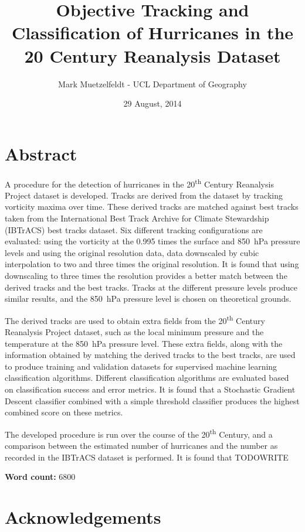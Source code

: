 \documentclass[pdftex,12pt,a4paper]{report}
\title{Objective Tracking and Classification of Hurricanes in the 20\ts{th} Century Reanalysis Dataset}
\author{Mark Muetzelfeldt - UCL Department of Geography}
\date{29 August, 2014}
\newcommand{\ts}{\textsuperscript}
\begin{document}


\onehalfspacing
\section*{Abstract}

A procedure for the detection of hurricanes in the 20\ts{th} Century Reanalysis Project dataset is
developed. Tracks are derived from the dataset by tracking vorticity maxima over time. These derived
tracks are matched against best tracks taken from the International Best Track Archive for Climate
Stewardship (IBTrACS) best tracks dataset. Six different tracking configurations are evaluated:
using the vorticity at the 0.995 times the surface and \SI{850}{hPa} pressure levels and using the
original resolution data, data downscaled by cubic interpolation to two and three times the original
resolution. It is found that using downscaling to three times the resolution provides a better match
between the derived tracks and the best tracks. Tracks at the different pressure levels produce
similar results, and the \SI{850}{hPa} pressure level is chosen on theoretical grounds.

The derived tracks are used to obtain extra fields from the 20\ts{th} Century Reanalysis
Project dataset, such as the local minimum pressure and the temperature at the \SI{850}{hPa}
pressure level. These extra fields, along with the information obtained by matching the derived
tracks to the best tracks, are used to produce training and validation datasets for supervised
machine learning classification algorithms. Different classification algorithms are evaluated based
on classification success and error metrics. It is found that a Stochastic Gradient Descent
classifier combined with a simple threshold classifier produces the highest combined score on these
metrics.

The developed procedure is run over the course of the 20\ts{th} Century, and a comparison between
the estimated number of hurricanes and the number as recorded in the IBTrACS dataset is performed.
It is found that TODOWRITE

\begin{center}
\textbf{Word count:} 6800 %
\end{center}

\section*{Acknowledgements}
\end{document}
